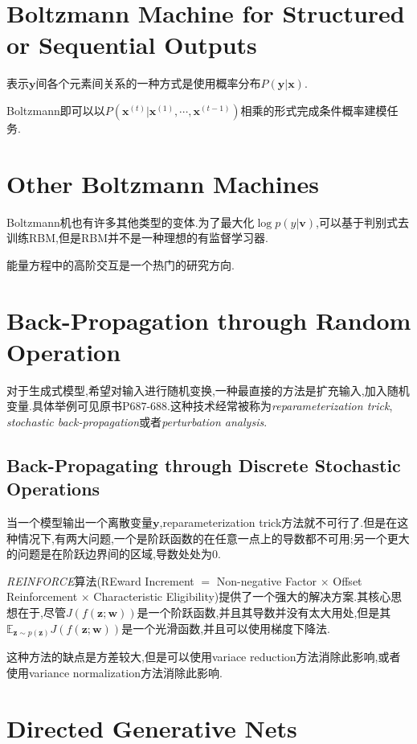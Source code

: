 \section{Boltzmann Machine for Structured or Sequential Outputs}

表示$\bm y$间各个元素间关系的一种方式是使用概率分布$P(\mathbf y|\bm x)$.

Boltzmann即可以以$P(\mathbf x^{(t)}|\mathbf x^{(1)},\cdots,\mathbf x^{(t-1)})$相乘的形式完成条件概率建模任务.

\section{Other Boltzmann Machines}

Boltzmann机也有许多其他类型的变体.为了最大化$\log p(y|\bm v)$,可以基于判别式去训练RBM,但是RBM并不是一种理想的有监督学习器.

能量方程中的高阶交互是一个热门的研究方向.

\section{Back-Propagation through Random Operation}

对于生成式模型,希望对输入进行随机变换,一种最直接的方法是扩充输入,加入随机变量.具体举例可见原书P$687$-$688$.这种技术经常被称为\textit{reparameterization trick}, \textit{stochastic back-propagation}或者\textit{perturbation analysis}.

\subsection{Back-Propagating through Discrete Stochastic Operations}

当一个模型输出一个离散变量$\bm y$,reparameterization trick方法就不可行了.但是在这种情况下,有两大问题,一个是阶跃函数的在任意一点上的导数都不可用;另一个更大的问题是在阶跃边界间的区域,导数处处为$0$.

\textit{REINFORCE}算法(REward Increment $=$ Non-negative Factor $\times$ Offset Reinforcement $\times$ Characteristic Eligibility)提供了一个强大的解决方案.其核心思想在于,尽管$J(f(\bm{z;w}))$是一个阶跃函数,并且其导数并没有太大用处,但是其$\mathbb E_{\bm z\sim p(\bm z)}J(f(\bm{z;w}))$是一个光滑函数,并且可以使用梯度下降法.

这种方法的缺点是方差较大,但是可以使用variace reduction方法消除此影响,或者使用variance normalization方法消除此影响.

\section{Directed Generative Nets}


